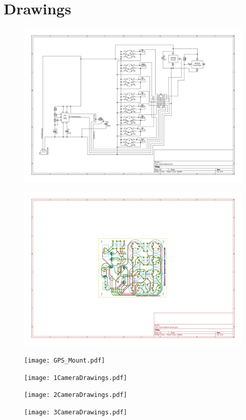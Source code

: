 \appendixpagenumbering
\chapter{Drawings} \label{App:Drawings}

\begin{figure}[H]
	\centerline{\includegraphics[angle=90,width=0.9\linewidth]{images/SensorSchematic.pdf}}
\end{figure}

\begin{figure}[H]
	\centerline{\includegraphics[angle=90,width=1.0\linewidth]{images/completeboard.pdf}}
\end{figure}

\begin{figure}[H]
	\centerline{\texttt{[image: GPS\_Mount.pdf]}}
\end{figure}

\begin{figure}[H]
	\centerline{\texttt{[image: 1CameraDrawings.pdf]}}
\end{figure}

\begin{figure}[H]
	\centerline{\texttt{[image: 2CameraDrawings.pdf]}}
\end{figure}

\begin{figure}[H]
	\centerline{\texttt{[image: 3CameraDrawings.pdf]}}
\end{figure}


